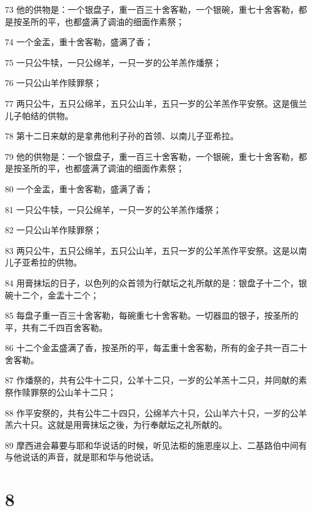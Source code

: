 \par 73 他的供物是：一个银盘子，重一百三十舍客勒，一个银碗，重七十舍客勒，都是按圣所的平，也都盛满了调油的细面作素祭；
\par 74 一个金盂，重十舍客勒，盛满了香；
\par 75 一只公牛犊，一只公绵羊，一只一岁的公羊羔作燔祭；
\par 76 一只公山羊作赎罪祭；
\par 77 两只公牛，五只公绵羊，五只公山羊，五只一岁的公羊羔作平安祭。这是俄兰儿子帕结的供物。
\par 78 第十二日来献的是拿弗他利子孙的首领、以南儿子亚希拉。
\par 79 他的供物是：一个银盘子，重一百三十舍客勒，一个银碗，重七十舍客勒，都是按圣所的平，也都盛满了调油的细面作素祭；
\par 80 一个金盂，重十舍客勒，盛满了香；
\par 81 一只公牛犊，一只公绵羊，一只一岁的公羊羔作燔祭；
\par 82 一只公山羊作赎罪祭；
\par 83 两只公牛，五只公绵羊，五只公山羊，五只一岁的公羊羔作平安祭。这是以南儿子亚希拉的供物。
\par 84 用膏抹坛的日子，以色列的众首领为行献坛之礼所献的是：银盘子十二个，银碗十二个，金盂十二个；
\par 85 每盘子重一百三十舍客勒，每碗重七十舍客勒。一切器皿的银子，按圣所的平，共有二千四百舍客勒。
\par 86 十二个金盂盛满了香，按圣所的平，每盂重十舍客勒，所有的金子共一百二十舍客勒。
\par 87 作燔祭的，共有公牛十二只，公羊十二只，一岁的公羊羔十二只，并同献的素祭作赎罪祭的公山羊十二只；
\par 88 作平安祭的，共有公牛二十四只，公绵羊六十只，公山羊六十只，一岁的公羊羔六十只。这就是用膏抹坛之後，为行奉献坛之礼所献的。
\par 89 摩西进会幕要与耶和华说话的时候，听见法柜的施恩座以上、二基路伯中间有与他说话的声音，就是耶和华与他说话。

\chapter{8}

